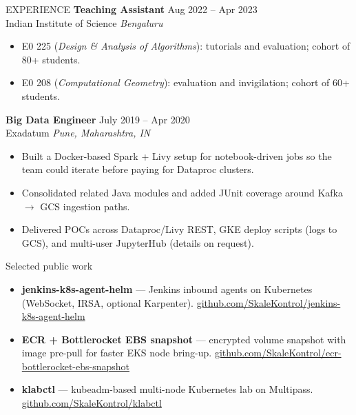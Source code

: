 \documentclass{resume} %
\begin{document}
\begin{rSection}{EXPERIENCE}
\textbf{Teaching Assistant} \hfill Aug 2022 -- Apr 2023\\
Indian Institute of Science \hfill \textit{Bengaluru}

\begin{itemize}
    \itemsep -3pt {}
    \item E0 225 (\textit{Design \& Analysis of Algorithms}): tutorials and evaluation; cohort of 80+ students.
    \item E0 208 (\textit{Computational Geometry}): evaluation and invigilation; cohort of 60+ students.
\end{itemize}


\textbf{Big Data Engineer} \hfill July 2019 -- Apr 2020\\
Exadatum \hfill \textit{Pune, Maharashtra, IN}

\begin{itemize}
    \itemsep -3pt {}
    \item Built a Docker-based Spark + Livy setup for notebook-driven jobs so the team could iterate before paying for Dataproc clusters.
    \item Consolidated related Java modules and added JUnit coverage around Kafka $\rightarrow$ GCS ingestion paths.
    \item Delivered POCs across Dataproc/Livy REST, GKE deploy scripts (logs to GCS), and multi-user JupyterHub (details on request).
\end{itemize}


\end{rSection} 

\begin{rSection}{Selected public work}

\begin{itemize}
    \itemsep -3pt {}
    \item \textbf{jenkins-k8s-agent-helm} --- Jenkins inbound agents on Kubernetes (WebSocket, IRSA, optional Karpenter). \href{https://github.com/SkaleKontrol/jenkins-k8s-agent-helm}{github.com/SkaleKontrol/jenkins-k8s-agent-helm}
    \item \textbf{ECR + Bottlerocket EBS snapshot} --- encrypted volume snapshot with image pre-pull for faster EKS node bring-up. \href{https://github.com/SkaleKontrol/ecr-bottlerocket-ebs-snapshot}{github.com/SkaleKontrol/ecr-bottlerocket-ebs-snapshot}
    \item \textbf{klabctl} --- kubeadm-based multi-node Kubernetes lab on Multipass. \href{https://github.com/SkaleKontrol/klabctl}{github.com/SkaleKontrol/klabctl}
\end{itemize}

\end{rSection}
\end{document}
